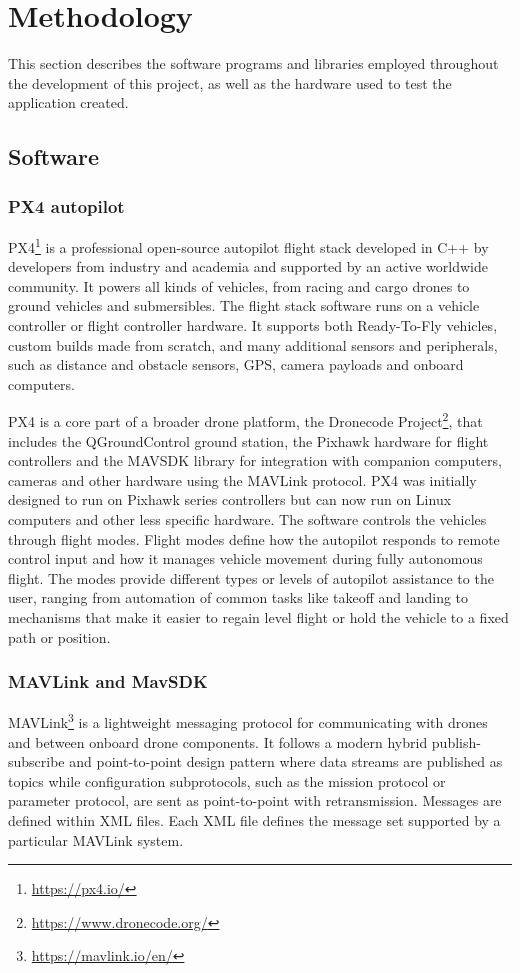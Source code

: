 \section{Methodology}

This section describes the software programs and libraries employed throughout the development of this project, as well as the hardware used to test the application created.

\subsection{Software}

\subsubsection{PX4 autopilot}
\label{subsec:px4}
PX4\footnote{\url{https://px4.io/}} is a professional open-source autopilot flight stack developed in C++ by developers from industry and academia and supported by an active worldwide community.
It powers all kinds of vehicles, from racing and cargo drones to ground vehicles and submersibles.
The flight stack software runs on a vehicle controller or flight controller hardware.
It supports both Ready-To-Fly vehicles, custom builds made from scratch,
and many additional sensors and peripherals, such as distance and obstacle sensors, GPS, camera payloads and onboard computers.

PX4 is a core part of a broader drone platform, the Dronecode Project\footnote{\url{https://www.dronecode.org/}}, that includes the QGroundControl ground station, the Pixhawk hardware for flight controllers and the MAVSDK library for integration with companion computers, cameras and other hardware using the MAVLink protocol.
PX4 was initially designed to run on Pixhawk series controllers but can now run on Linux computers and other less specific hardware.
The software controls the vehicles through flight modes. 
Flight modes define how the autopilot responds to remote control input and how it manages vehicle movement during fully autonomous flight.
The modes provide different types or levels of autopilot assistance to the user, ranging from automation of common tasks like takeoff and landing 
to mechanisms that make it easier to regain level flight or hold the vehicle to a fixed path or position.

\subsubsection{MAVLink and MavSDK}
\label{subsec:mavlink}
MAVLink\footnote{\url{https://mavlink.io/en/}} is a lightweight messaging protocol for communicating with drones and between onboard drone components.
It follows a modern hybrid publish-subscribe and point-to-point design pattern where data streams are published as topics while configuration subprotocols,
such as the mission protocol or parameter protocol, are sent as point-to-point with retransmission.
Messages are defined within XML files.
Each XML file defines the message set supported by a particular MAVLink system.

